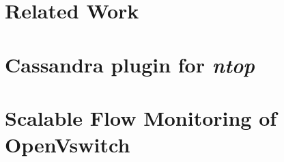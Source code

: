 \documentclass[a4,12pt,oneside]{book}
\begin{document}
\chapter{\label{chap:survey}Related Work}

\chapter{\label{chap:ntop} Cassandra plugin for \emph{ntop}}

\chapter{\label{chap:ovs}Scalable Flow Monitoring of OpenVswitch}

%
%
%
\nocite{*}

\newpage
{}

\newpage
{}
\end{document}

